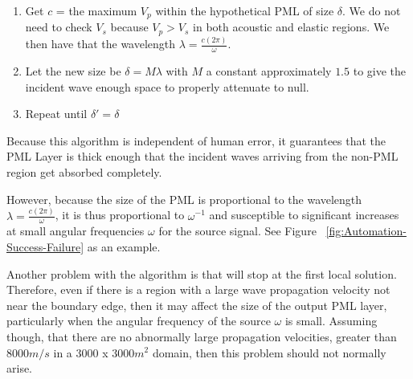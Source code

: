 \begin{enumerate}
\item Get $c$ = the maximum $V_p$ within the hypothetical PML of size $\delta$. We do not need to check $V_s$ because $V_p > V_s$ in both acoustic and elastic regions. We then have that the wavelength $\lambda = \frac{c (2 \pi)}{\omega}$.
\item Let the new size be $\delta =  M \lambda$ with $M$ a constant approximately $1.5$ to give the incident wave enough space to properly attenuate to null.
\item Repeat until $\delta' = \delta$
\end{enumerate}

Because this algorithm is independent of human error, it guarantees that the PML Layer is thick enough that the incident waves arriving from the non-PML region get absorbed completely. 

However, because the size of the PML is proportional to the wavelength $\lambda = \frac{c (2 \pi)}{\omega}$, it is thus proportional to $\omega^{-1}$ and susceptible to significant increases at small angular frequencies $\omega$ for the source signal. See Figure ~\ref{fig:Automation-Success-Failure} as an example.

Another problem with the algorithm is that will stop at the first local solution. Therefore, even if there is a region with a large wave propagation velocity not near the boundary edge, then it may affect the size of the output PML layer, particularly when the angular frequency of the source $\omega$ is small. Assuming though, that there are no abnormally large propagation velocities, greater than $8000 m/s$ in a $3000$ x $3000 m^2$ domain, then this problem should not normally arise.

